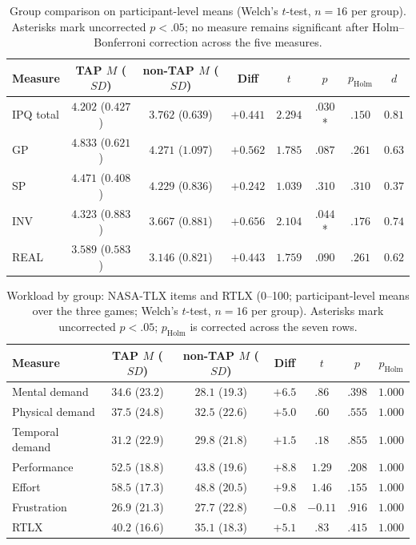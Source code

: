 \begin{table}[t]
\centering
\caption{Group comparison on participant-level means (Welch's $t$-test, $n=16$ per group). Asterisks mark uncorrected $p<.05$; no measure remains significant after Holm--Bonferroni correction across the five measures.}
\label{tab:group}
\small
\begin{tabular}{lccccccc}
\hline
Measure & TAP $M$ ($SD$) & non-TAP $M$ ($SD$) & Diff & $t$ & $p$ & $p_{\mathrm{Holm}}$ & $d$ \\
\hline
IPQ total & $4.202$ ($0.427$) & $3.762$ ($0.639$) & $+0.441$ & $2.294$ & $.030$* & $.150$ & $0.81$ \\
GP & $4.833$ ($0.621$) & $4.271$ ($1.097$) & $+0.562$ & $1.785$ & $.087$ & $.261$ & $0.63$ \\
SP & $4.471$ ($0.408$) & $4.229$ ($0.836$) & $+0.242$ & $1.039$ & $.310$ & $.310$ & $0.37$ \\
INV & $4.323$ ($0.883$) & $3.667$ ($0.881$) & $+0.656$ & $2.104$ & $.044$* & $.176$ & $0.74$ \\
REAL & $3.589$ ($0.583$) & $3.146$ ($0.821$) & $+0.443$ & $1.759$ & $.090$ & $.261$ & $0.62$ \\
\hline
\end{tabular}
\end{table}

\begin{table}[t]
\centering
\caption{Workload by group: NASA-TLX items and RTLX (0--100; participant-level means over the three games; Welch's $t$-test, $n=16$ per group). Asterisks mark uncorrected $p<.05$; $p_{\mathrm{Holm}}$ is corrected across the seven rows.}
\label{tab:workload}
\small
\begin{tabular}{lcccccc}
\hline
Measure & TAP $M$ ($SD$) & non-TAP $M$ ($SD$) & Diff & $t$ & $p$ & $p_{\mathrm{Holm}}$ \\
\hline
Mental demand & $34.6$ ($23.2$) & $28.1$ ($19.3$) & $+6.5$ & $.86$ & $.398$ & $1.000$ \\
Physical demand & $37.5$ ($24.8$) & $32.5$ ($22.6$) & $+5.0$ & $.60$ & $.555$ & $1.000$ \\
Temporal demand & $31.2$ ($22.9$) & $29.8$ ($21.8$) & $+1.5$ & $.18$ & $.855$ & $1.000$ \\
Performance & $52.5$ ($18.8$) & $43.8$ ($19.6$) & $+8.8$ & $1.29$ & $.208$ & $1.000$ \\
Effort & $58.5$ ($17.3$) & $48.8$ ($20.5$) & $+9.8$ & $1.46$ & $.155$ & $1.000$ \\
Frustration & $26.9$ ($21.3$) & $27.7$ ($22.8$) & $-0.8$ & $-0.11$ & $.916$ & $1.000$ \\
RTLX & $40.2$ ($16.6$) & $35.1$ ($18.3$) & $+5.1$ & $.83$ & $.415$ & $1.000$ \\
\hline
\end{tabular}
\end{table}

